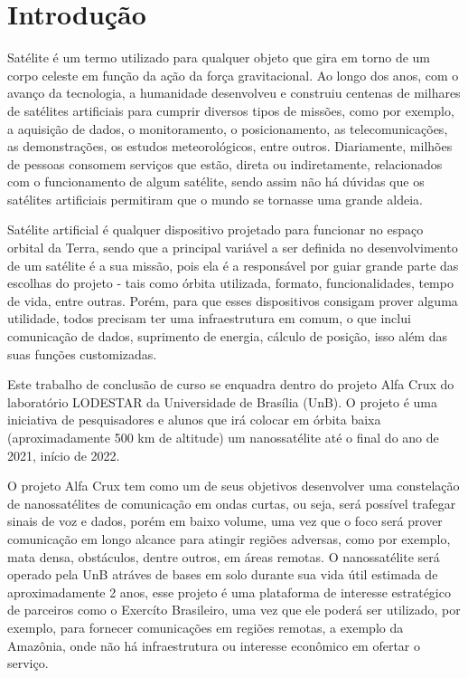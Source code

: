 \chapter{Introdução} \label{introducao}
Satélite é um termo utilizado para qualquer objeto que gira em torno de um corpo celeste em função da ação da força gravitacional. Ao longo dos anos, com o avanço da tecnologia, a humanidade desenvolveu e construiu centenas de milhares de satélites artificiais para cumprir diversos tipos de missões, como por exemplo, a  aquisição de dados, o monitoramento, o posicionamento, as telecomunicações, as demonstrações, os estudos meteorológicos, entre outros. Diariamente, milhões de pessoas consomem serviços que estão, direta ou indiretamente, relacionados com o funcionamento de algum satélite, sendo assim não há dúvidas que os satélites artificiais permitiram que o mundo se tornasse uma grande aldeia.

Satélite artificial é qualquer dispositivo projetado para funcionar no espaço orbital da Terra, sendo que a principal variável a ser definida no desenvolvimento de um satélite é a sua missão, pois ela é a responsável por guiar grande parte das escolhas do projeto - tais como órbita utilizada, formato, funcionalidades, tempo de vida, entre outras. Porém, para que esses dispositivos consigam prover alguma utilidade, todos precisam ter uma infraestrutura em comum, o que inclui comunicação de dados, suprimento de energia, cálculo de posição, isso além das suas funções customizadas.\cite{nasa_comms_article} 

Este trabalho de conclusão de curso se enquadra dentro do projeto Alfa Crux do laboratório LODESTAR da Universidade de Brasília (UnB). O projeto é uma iniciativa de pesquisadores e alunos que irá colocar em órbita baixa (aproximadamente 500 km de altitude) um nanossatélite até o final do ano de 2021, início de 2022.

O projeto Alfa Crux tem como um de seus objetivos desenvolver uma constelação de nanossatélites de comunicação em ondas curtas, ou seja, será possível trafegar sinais de voz e dados, porém em baixo volume, uma vez que o foco será prover comunicação em longo alcance para atingir regiões adversas, como por exemplo, mata densa, obstáculos, dentre outros, em áreas remotas. O nanossatélite será operado pela UnB atráves de bases em solo durante sua vida útil estimada de aproximadamente 2 anos, esse projeto é uma plataforma de interesse estratégico de parceiros como o Exercíto Brasileiro, uma vez que ele poderá ser utilizado, por exemplo, para fornecer comunicações em regiões remotas, a exemplo da Amazônia, onde não há infraestrutura ou interesse econômico em ofertar o serviço. 


